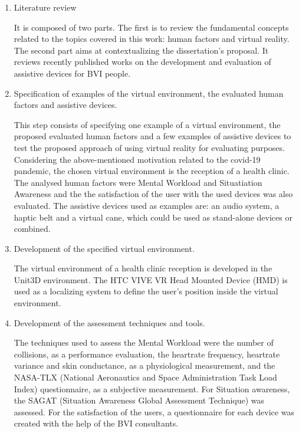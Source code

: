 \begin{enumerate}[leftmargin = 6em, label = Step \arabic* -- ]
    \item Literature review 
    
    It is composed of two parts. The first is to review the fundamental concepts related to the topics covered in this work: human factors and virtual reality. The second part aims at contextualizing the dissertation’s proposal. It reviews recently published works on the development and evaluation of assistive devices for BVI people.
    
    \item Specification of examples of the virtual environment, the evaluated human factors and assistive devices.

    This step consists of specifying one example of a virtual environment, the proposed evaluated human factors and a few examples of assistive devices to test the proposed approach of using virtual reality for evaluating purposes. Considering the above-mentioned motivation related to the covid-19 pandemic, the chosen virtual environment is the reception of a health clinic. The analysed human factors were Mental Workload and Situatiation Awareness and the the satisfaction of the user with the used devices was also evaluated. The assistive devices used as examples are: an audio system, a haptic belt and a virtual cane, which could be used as stand-alone devices or combined.
    
    \item Development of the specified virtual environment.
    
    The virtual environment of a health clinic reception is developed in the Unit3D environment. The HTC VIVE VR Head Mounted Device (HMD) is used as a localizing system to define the user's position inside the virtual environment.

    \item Development of the assessment techniques and tools.
    
    The techniques used to assess the Mental Workload were the number of collisions, as a performance evaluation, the heartrate frequency, heartrate variance and skin conductance, as a physiological measurement, and the NASA-TLX (National Aeronautics and Space Administration Task Load Index) questionnaire, as a subjective measurement. For Situation awareness, the SAGAT (Situation Awareness Global Assessment Technique) was assessed. For the satisfaction of the users, a questionnaire for each device was created with the help of the BVI consultants.
    

\end{enumerate}
